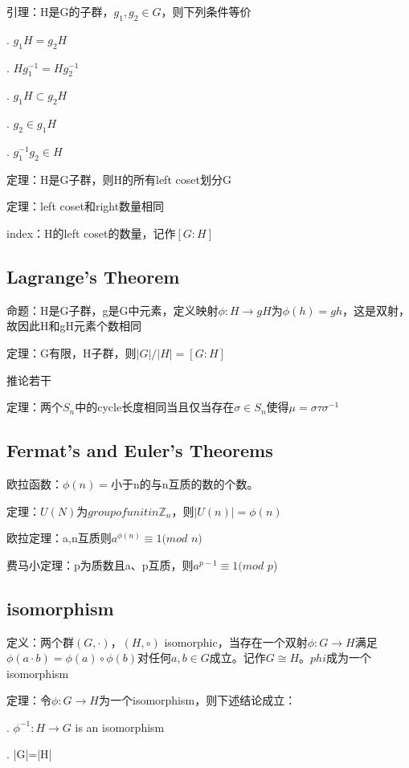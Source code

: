 \documentclass[cn,hazy,blue,screen,14pt]{note}
\begin{document}
引理：H是G的子群，$g_{1},g_{2}\in G$，则下列条件等价

. $g_{1}H=g_{2}H$

. $Hg_{1}^{-1}=Hg_{2}^{-1}$

. $g_{1}H\subset g_{2}H$

. $g_{2}\in g_{1}H$

. $g_{1}^{-1}g_{2}\in H$

定理：H是G子群，则H的所有left coset划分G

定理：left coset和right数量相同

index：H的left coset的数量，记作$[G:H]$

\subsection{Lagrange's Theorem}
命题：H是G子群，g是G中元素，定义映射$\phi:H\rightarrow gH$为$\phi(h)=gh$，这是双射，故因此H和gH元素个数相同

定理：G有限，H子群，则$|G|/|H|=[G:H]$

推论若干

定理：两个$S_{n}$中的cycle长度相同当且仅当存在$\sigma\in S_{n}$使得$\mu=\sigma\tau\sigma^{-1}$

\subsection{Fermat's and Euler's Theorems}
欧拉函数：$\phi(n)=$小于n的与n互质的数的个数。

定理：$U(N)$为$group of unit in \mathbb{Z}_{n}$，则$|U(n)|=\phi(n)$

欧拉定理：a,n互质则$a^{\phi(n)}\equiv 1(mod$ $n)$

费马小定理：p为质数且a、p互质，则$a^{p-1}\equiv 1(mod$ $p$)



\subsection{isomorphism}
定义：两个群$(G,\cdot)$，$(H,\circ)$ isomorphic，当存在一个双射$\phi:G\rightarrow H$满足$\phi(a\cdot b)=\phi(a)\circ \phi(b)$对任何$a,b\in G$成立。记作$G\cong H$。$phi$成为一个isomorphism

定理：令$\phi:G\rightarrow H$为一个isomorphism，则下述结论成立：

. $\phi^{-1}:H\rightarrow G$ is an isomorphism

. |G|=|H|
\end{document}
